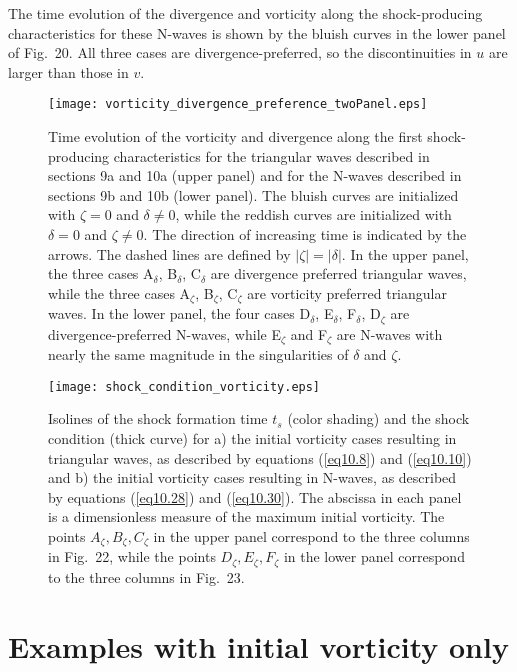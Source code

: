 \documentclass[10pt]{article}
\begin{document}
The time evolution of the divergence and vorticity along the shock-producing
characteristics for these N-waves is shown by the bluish curves in the
lower panel of Fig.~20. All three cases are divergence-preferred,
so the discontinuities in $u$ are larger than those in $v$.

\begin{figure}[!thp]               %
\centerline{\texttt{[image: vorticity\_divergence\_preference\_twoPanel.eps]}}
\caption{Time evolution of the vorticity and divergence along the first shock-producing
characteristics for the triangular waves described in sections 9a and 10a (upper panel)
and for the N-waves described in sections 9b and 10b (lower panel). The bluish curves
are initialized with $\zeta=0$ and $\delta\ne0$, while the reddish curves are
initialized with $\delta=0$ and $\zeta\ne0$. The direction of increasing time
is indicated by the arrows. The dashed lines are defined by $|\zeta|=|\delta|$.
In the upper panel, the three cases A$_\delta$, B$_\delta$, C$_\delta$ are
divergence preferred triangular waves, while the three cases A$_\zeta$, B$_\zeta$,
C$_\zeta$ are vorticity preferred triangular waves. In the lower panel, the
four cases D$_\delta$, E$_\delta$, F$_\delta$, D$_\zeta$ are divergence-preferred
N-waves, while E$_\zeta$ and F$_\zeta$ are N-waves with nearly the same
magnitude in the singularities of $\delta$ and $\zeta$.}
\end{figure}



\begin{figure}[!th]                          %
\centerline{\texttt{[image: shock\_condition\_vorticity.eps]}}
\caption{Isolines of the shock formation time $t_s$ (color shading) and the shock
condition (thick curve) for a) the initial vorticity cases resulting in triangular
waves, as described by equations (\ref{eq10.8}) and (\ref{eq10.10}) and b) the
initial vorticity cases resulting in N-waves, as described by
equations (\ref{eq10.28}) and (\ref{eq10.30}). The abscissa in each panel is
a dimensionless measure of the maximum initial vorticity. The points
$A_\zeta,B_\zeta,C_\zeta$ in the upper panel correspond to the three columns
in Fig.~22, while the points $D_\zeta,E_\zeta,F_\zeta$ in the lower panel
correspond to the three columns in Fig.~23.}
\end{figure}

\section{Examples with initial vorticity only}     %
\end{document}
